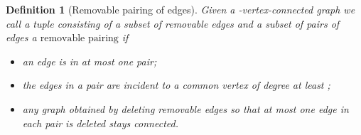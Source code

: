 \documentclass[letterpaper,11pt]{article}
\newtheorem{definition}[theorem]{Definition}
\newcommand{\MS}{\ensuremath{\mbox{removable pairing}}\xspace}
\begin{document}
\vspace{-0.1cm}
\begin{definition}[Removable pairing of edges] \label{def:pairing}
  Given a -vertex-connected graph  we call a tuple  consisting of a  subset  of removable edges and  a subset    of pairs of edges a  \emph{\MS{}} if
\vspace{-0.2cm}
  \begin{itemize}\itemsep-1mm
    \item an edge is in at most one pair;
    \item the edges in a pair are incident to a common vertex of degree at least ;
    \item any graph obtained by deleting removable edges so that at most one edge in each pair is deleted stays connected.
  \end{itemize}
\end{definition}
\end{document}
